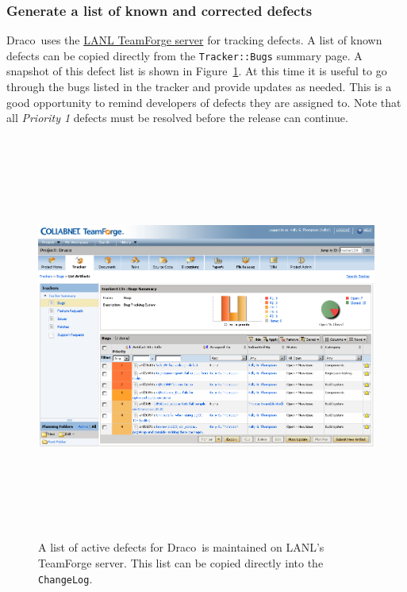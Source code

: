 \documentclass[note]{ResearchNote_pdf}
\newcommand{\draco}{{\normalfont\small\sffamily Draco}}
\begin{document}

\subsubsection{Generate a list of known and corrected defects}
\label{sec:list_of_defects}

\draco\ uses the \href{https://tf.lanl.gov}{LANL TeamForge server} for
tracking defects.  A list of known defects can be copied directly from
the \texttt{Tracker::Bugs} summary page.  A snapshot of this defect
list is shown in Figure~\ref{fig:sample-bug-itemization-on-tf}. At
this time it is useful to go through the bugs listed in the tracker
and provide updates as needed.  This is a good opportunity to remind
developers of defects they are assigned to.  Note that all
\textit{Priority 1} defects must be resolved before the release can
continue.

\begin{figure}
  \centerline{ \includegraphics[height=5.25in, angle=90]
{sample-bug-itemization-on-tf.png}}
  \caption{A list of active defects for \draco\ is maintained on
    LANL's TeamForge server.  This list can be copied directly into
    the \texttt{ChangeLog}.}
  \label{fig:sample-bug-itemization-on-tf}
\end{figure}
\end{document}
